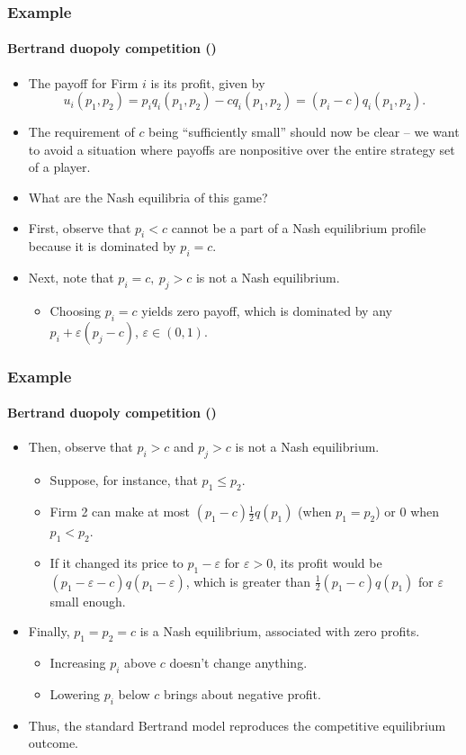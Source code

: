 \documentclass[10pt]{beamer}
\theoremstyle{definition}
\begin{document}
\begin{frame}[fragile]
	\frametitle{Example }
	\framesubtitle{Bertrand duopoly competition ()}
	\begin{itemize}\itemsep1em
		\item The payoff for Firm $i$ is its profit, given by 
		\[ u_i(p_1,p_2) = p_i q_i(p_1,p_2) - c q_i(p_1,p_2) = (p_i-c) q_i(p_1,p_2). \]
		\item The requirement of $c$ being ``sufficiently small'' should now be clear -- we want to avoid a situation where payoffs are nonpositive over the entire strategy set of a player.
		\item What are the Nash equilibria of this game?
		\item First, observe that $p_i < c$ cannot be a part of a Nash equilibrium profile because it is dominated by $p_i = c$.
		\item Next, note that $p_i = c, ~ p_j > c $ is not a Nash equilibrium.
		\begin{itemize}\setlength\itemsep{0.5em}
			\item Choosing $p_i = c$ yields zero payoff, which is dominated by any $p_i + \varepsilon (p_j-c)$, $\varepsilon \in (0,1)$.
		\end{itemize}
	\end{itemize}
\end{frame}


\begin{frame}[fragile]
	\frametitle{Example }
	\framesubtitle{Bertrand duopoly competition ()}
	\begin{itemize}\itemsep1em
		\item Then, observe that $p_i > c$ and $p_j > c$ is not a Nash equilibrium.
		\begin{itemize}\setlength\itemsep{0.5em}
			\item Suppose, for instance, that $p_1 \leq p_2$.
			\item Firm 2 can make at most $(p_1-c) \frac{1}{2}q(p_1)$ (when $p_1=p_2$) or 0 when $p_1<p_2$.
			\item If it changed its price to $p_1-\varepsilon$ for $\varepsilon>0$, its profit would be $(p_1-\varepsilon-c)q(p_1-\varepsilon)$, which is greater than $\frac{1}{2}(p_1-c) q(p_1)$ for $\varepsilon$ small enough.
		\end{itemize}
		\item Finally, $p_1=p_2=c$ is a Nash equilibrium, associated with zero profits.
		\begin{itemize}\setlength\itemsep{0.5em}
			\item Increasing $p_i$ above $c$ doesn't change anything.
			\item Lowering $p_i$ below $c$ brings about negative profit.
		\end{itemize}
		\item Thus, the standard Bertrand model reproduces the competitive equilibrium outcome.
	\end{itemize}
\end{frame}
\end{document}
